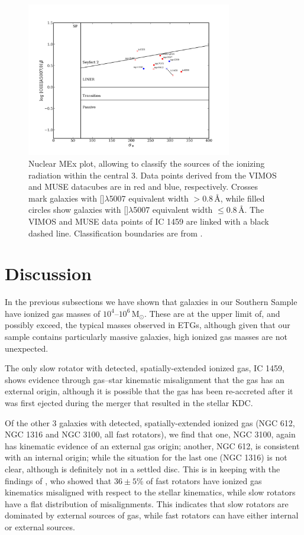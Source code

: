 		\begin{figure}
			\centering
			\includegraphics[width=0.8\textwidth]{chapter5/nuclear_MEx.png}
			\caption[Nuclear mass--excitation plot]{Nuclear MEx plot, allowing to classify the sources of the ionizing radiation within the central 3\arcsec. Data points derived from the VIMOS and MUSE datacubes are in red and blue, respectively. Crosses mark galaxies with []$\lambda$5007 equivalent width $> 0.8$\,\AA, while filled circles show galaxies with []$\lambda$5007 equivalent width $\leqslant 0.8$\,\AA. The VIMOS and MUSE data points of IC 1459 are linked with a black dashed line. Classification boundaries are from \citet{Nyland2016}.}
			\label{fig:MEx}
		\end{figure}


\section{Discussion}
	\label{sec:gasDiscussion}
	In the previous subsections we have shown that galaxies in our Southern Sample have ionized gas masses of $10^4$--$10^6\,\mathrm{M_\odot}$. These are at the upper limit of, and possibly exceed, the typical masses observed in ETGs, although given that our sample contains particularly massive galaxies, high ionized gas masses are not unexpected. 

	The only slow rotator with detected, spatially-extended ionized gas, IC 1459, shows evidence through gas--star kinematic misalignment that the gas has an external origin, although it is possible that the gas has been re-accreted after it was first ejected during the merger that resulted in the stellar KDC. 

	Of the other 3 galaxies with detected, spatially-extended ionized gas (NGC 612, NGC 1316 and NGC 3100, all fast rotators), we find that one, NGC 3100, again has kinematic evidence of an external gas origin; another, NGC 612, is consistent with an internal origin; while the situation for the last one (NGC 1316) is not clear, although is definitely not in a settled disc. This is in keeping with the findings of \citet{Davis2011a}, who showed that $36\pm5$\% of fast rotators have ionized gas kinematics misaligned with respect to the stellar kinematics, while slow rotators have a flat distribution of misalignments. This indicates that slow rotators are dominated by external sources of gas, while fast rotators can have either internal or external sources. 

